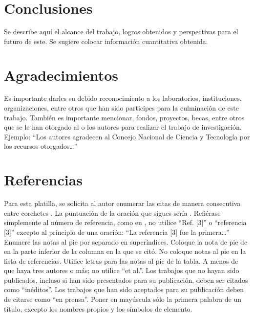     \section{Conclusiones}
    
    Se describe aquí el alcance del trabajo, logros obtenidos y perspectivas para el futuro de este. Se sugiere colocar información cuantitativa obtenida.
    
    \section{Agradecimientos}
    
    Es importante darles su debido reconocimiento a los laboratorios, instituciones, organizaciones, entre otros que han sido participes para la culminación de este trabajo. También es importante mencionar, fondos, proyectos, becas, entre otros que se le han otorgado al o los autores para realizar el trabajo de investigación. Ejemplo: “Los autores agradecen al Concejo Nacional de Ciencia y Tecnología por los recursos otorgados…”
    
    \section*{Referencias}
    
    Para esta platilla, se solicita al autor enumerar las citas de manera consecutiva entre corchetes . 
    La puntuación de la oración que sigues sería . 
    Refiérase simplemente al número de referencia, como en , no utilice “Ref. [3]” o “referencia [3]” excepto al principio de una oración: “La referencia [3] fue la primera…”
    Enumere las notas al pie por separado en superíndices. Coloque la nota de pie de en la parte inferior de la columna en la que se citó. No coloque notas al pie en la lista de referencias. Utilice letras para las notas al pie de la tabla.
    A menos de que haya tres autores o más; no utilice “et al.”. Los trabajos que no hayan sido publicados, incluso si han sido presentados para su publicación, deben ser citados como “inéditos”. Los trabajos que han sido aceptados para su publicación deben de citarse como “en prensa”. Poner en mayúscula sólo la primera palabra de un título, excepto los nombres propios y los símbolos de elemento. 
    
    
    
